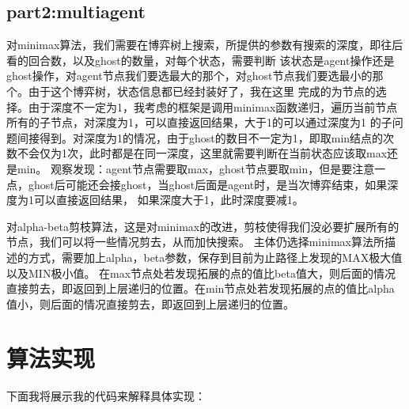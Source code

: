 \documentclass{report}
\begin{document}
    \section{part2:multiagent}
    对minimax算法，我们需要在博弈树上搜索，所提供的参数有搜索的深度，即往后看的回合数，以及ghost的数量，对每个状态，需要判断
    该状态是agent操作还是ghost操作，对agent节点我们要选最大的那个，对ghost节点我们要选最小的那个。由于这个博弈树，状态信息都已经封装好了，我在这里
    完成的为节点的选择。由于深度不一定为1，我考虑的框架是调用minimax函数递归，遍历当前节点所有的子节点，对深度为1，可以直接返回结果，大于1的可以通过深度为1
    的子问题间接得到。对深度为1的情况，由于ghost的数目不一定为1，即取min结点的次数不会仅为1次，此时都是在同一深度，这里就需要判断在当前状态应该取max还是min。
    观察发现：agent节点需要取max，ghost节点要取min，但是要注意一点，ghost后可能还会接ghost，当ghost后面是agent时，是当次博弈结束，如果深度为1可以直接返回结果，
    如果深度大于1，此时深度要减1。\par 
    对alpha-beta剪枝算法，这是对minimax的改进，剪枝使得我们没必要扩展所有的节点，我们可以将一些情况剪去，从而加快搜索。
    主体仍选择minimax算法所描述的方式，需要加上alpha，beta参数，保存到目前为止路径上发现的MAX极大值以及MIN极小值。
    在max节点处若发现拓展的点的值比beta值大，则后面的情况直接剪去，即返回到上层递归的位置。在min节点处若发现拓展的点的值比alpha值小，则后面的情况直接剪去，即返回到上层递归的位置。\par 
    \chapter{算法实现}
    下面我将展示我的代码来解释具体实现：
\end{document}
